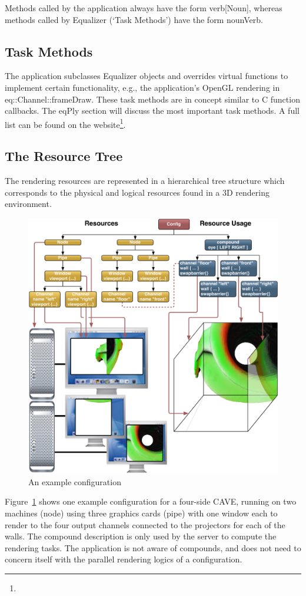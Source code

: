 \documentclass[10pt,a4]{scrartcl}
\newcommand{\fig}[1]{Figure~\ref{#1}}
\begin{document}
Methods called by the application always have the form
\textsf{verb[Noun]}, whereas methods called by Equalizer (`Task
Methods') have the form \textsf{nounVerb}.

\subsection{\label{ssTaskMethods}Task Methods}

The application subclasses Equalizer objects and overrides virtual
functions to implement certain functionality, e.g., the application's
OpenGL rendering in \textsf{eq::Chan\-nel::frameDraw}. These task
methods are in concept similar to C function callbacks. The
\textsf{eqPly} section will discuss the most important task methods. A
full list can be found on the
website\footnote{}.


\subsection{The Resource Tree}

The rendering resources are represented in a hierarchical tree structure
which corresponds to the physical and logical resources found in a 3D
rendering environment. 

\begin{figure}
  \includegraphics[width=.6\textwidth]{images/cave.pdf}
  {\caption{\small\label{fConfig}An example configuration}}
\end{figure}

\fig{fConfig} shows one example configuration for a four-side
CAVE\texttrademark, running on two machines (node) using three graphics
cards (pipe) with one window each to render to the four output channels
connected to the projectors for each of the walls. The compound
description is only used by the server to compute the rendering
tasks. The application is not aware of compounds, and does not need to
concern itself with the parallel rendering logics of a configuration.
\end{document}
